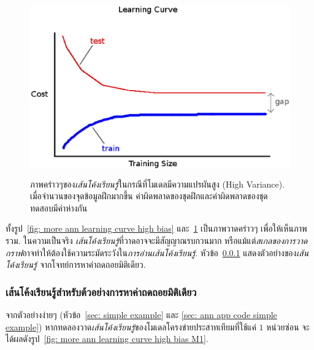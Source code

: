 %
\begin{figure}
\begin{center}
\includegraphics[height=3in]{04ANNlearncurve/LCHighVariance.eps}
\end{center}
\caption{ภาพคร่าวๆของ\textit{เส้นโค้งเรียนรู้}ในกรณีที่โมเดลมีความแปรผันสูง (High Variance). เมื่อจำนวนของจุดข้อมูลฝึกมากขึ้น ค่าผิดพลาดของชุดฝึกและค่าผิดพลาดของชุดทดสอบมีค่าห่างกัน}
\label{fig: more ann learning curve high variance}
\end{figure}

ทั้งรูป~\ref{fig: more ann learning curve high bias} และ~\ref{fig: more ann learning curve high variance} เป็นภาพวาดคร่าวๆ เพื่อให้เห็นภาพรวม.
ในความเป็นจริง \textit{เส้นโค้งเรียนรู้}ที่วาดอาจจะมีสัญญาณรบกวนมาก 
หรือแม้แต่\textit{สเกลของการวาดกราฟ}อาจทำให้ต้องใช้ความระมัดระวังใน\textit{การอ่านเส้นโค้งเรียนรู้}.
หัวข้อ~\ref{sec: ann more learning curve example} แสดงตัวอย่างของ\textit{เส้นโค้งเรียนรู้}
จากโจทย์การหาค่าถดถอยมิติเดียว. %

\subsubsection{เส้นโค้งเรียนรู้สำหรับต้วอย่างการหาค่าถดถอยมิติเดียว}
\label{sec: ann more learning curve example}

จากตัวอย่างง่ายๆ (หัวข้อ~\ref{sec: simple example} และ \ref{sec: ann app code simple example}) หากทดลองวาด\textit{เส้นโค้งเรียนรู้}ของโมเดลโครงข่ายประสาทเทียมที่ใช้แค่ $1$ หน่วยซ่อน จะได้ผลดังรูป~\ref{fig: more ann learning curve high bias M1}.

